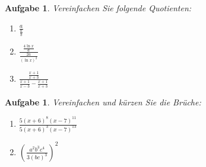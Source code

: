 \documentclass[12pt]{article}
\newtheorem{exercise}[satz]{Aufgabe}
\begin{document}
\vspace{0.2cm}

\begin{exercise}
  Vereinfachen Sie folgende Quotienten:
  \begin{multicols}{2}
    \begin{enumerate}
      \item[(a)] $\frac{a}{\frac{a}{b}}$
      \item[(b)] $\frac{\frac{4 \ln{x}}{a}}{\frac{2a}{(\ln{x})^2}}$
      \item[(c)] $\frac{\frac{x+1}{x+3}}{\frac{x+1}{x-3}-\frac{x+1}{x+3}}$
    \end{enumerate}
  \end{multicols}
\end{exercise}

\vspace{0.2cm}

\begin{exercise}
  Vereinfachen und k\"urzen Sie die Br\"uche:
  \begin{enumerate}
    \item[(a)] $\frac{5(x+6)^8 (x-7)^{11}}{5(x+6)^3 (x-7)^{13}}$
    \item[(b)] $(\frac{a^2b^3c^4}{3(bc)^3})^2$
  \end{enumerate}
\end{exercise}
\end{document}

